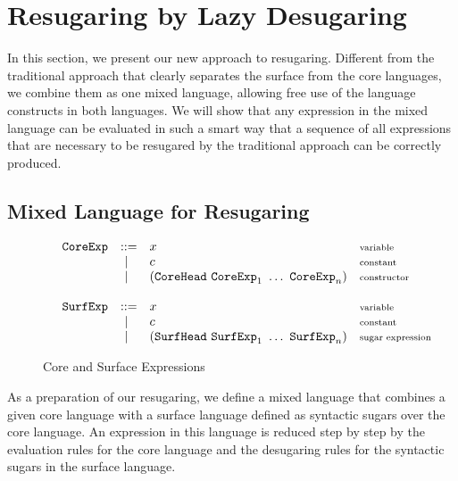 
\section{Resugaring by Lazy Desugaring}
\label{sec3}

In this section, we present our new approach to resugaring. Different from the traditional approach that clearly separates the surface from the core languages, we combine them as one mixed language, allowing free use of the language constructs in both languages. We will show that any expression in the mixed language can be evaluated in such a smart way that a sequence of all expressions that are necessary to be resugared by the traditional approach can be correctly produced.

\subsection{Mixed Language for Resugaring}

\begin{figure}[t]
{\footnotesize
\[
	\begin{array}{lllll}
	 &\mbox{\tt CoreExp} &::=& x  & \mbox{{\scriptsize variable}}\\
	       &&~|~& c  & \mbox{{\scriptsize constant}}\\
				 &&~|~& (\mbox{\tt CoreHead}~\mbox{\tt CoreExp}_1~\ldots~\mbox{\tt CoreExp}_n) & \mbox{{\scriptsize constructor}}\\
	\\
	 &\mbox{\tt SurfExp} &::=& x  & \mbox{{\scriptsize variable}}\\
	       &&~|~& c  & \mbox{{\scriptsize constant}}\\
					 &&~|~& (\mbox{\tt SurfHead}~\mbox{\tt SurfExp}_1~\ldots~\mbox{\tt SurfExp}_n) & \mbox{{\scriptsize sugar expression}}\\
	\end{array}
	\]
}
	
	\caption{Core and Surface Expressions}
	\label{fig:expression}
\end{figure}

As a preparation of our resugaring, we define a mixed language that combines a given core language with a surface language defined as syntactic sugars over the core language. An expression in this language is reduced step by step by the evaluation rules for the core language and the desugaring rules for the syntactic sugars in the surface language.

